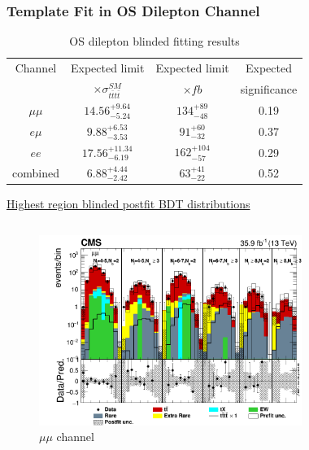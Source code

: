 \documentclass{beamer}
\begin{document}
\begin{frame}
\frametitle{Template Fit in OS Dilepton Channel}
\vspace{-10pt} 
\begin{table}
\caption{OS dilepton blinded fitting results}
\vspace{0pt} 
\begin{tabular}{| c | c | c | c |}
\hline
Channel	&Expected limit	&Expected limit	&Expected \\
 & $\times \sigma_{t\bar{t}t\bar{t}}^{SM}$ &  $\times fb$ &significance \\
\hline
$\mu \mu$	&$14.56_{-5.24}^{+9.64}$ &$134_{-48}^{+89}$ &0.19  \\
\hline
$e \mu$		&$9.88_{-3.53}^{+6.53}$ &$91_{-32}^{+60}$ &0.37  \\
\hline
$ee$			&$17.56_{-6.19}^{+11.34}$ &$162_{-57}^{+104}$ &0.29  \\
\hline
combined		&$6.88_{-2.42}^{+4.44}$ &$63_{-22}^{+41}$ &0.52  \\
\hline
\end{tabular} 
\end{table}
\underline{Highest region blinded postfit BDT distributions} \vspace{-10pt}
\begin{columns}
	\begin{figure}
		\includegraphics[width=\linewidth]{hist_mumu_log.png}
		\caption{$\mu \mu$ channel}
	\end{figure}
	\begin{figure}

\end{figure}
\end{columns}
\end{frame}
\end{document}
